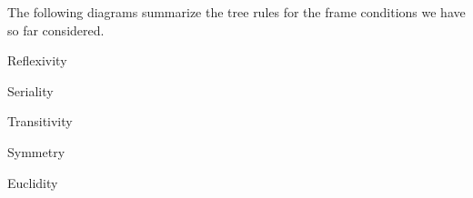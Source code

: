 The following diagrams summarize the tree rules for the frame conditions we have
so far considered.
%
\begin{center}

  \begin{minipage}[t]{0.3\textwidth} \centering

    Reflexivity
    
    \vspace{-3mm}

  \end{minipage}
  \begin{minipage}[t]{0.3\textwidth} \centering
    Seriality

    \vspace{-3mm}

  \end{minipage}
  \begin{minipage}[t]{0.3\textwidth} \centering
    Transitivity

    \medskip
    
  \end{minipage}
  \bigskip
  
  \begin{minipage}[t]{0.3\textwidth} \centering
    Symmetry

    \medskip
    
  \end{minipage}
  \begin{minipage}[t]{0.3\textwidth} \centering
    Euclidity
    

\end{minipage}
\end{center}

